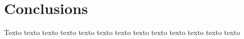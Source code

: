 \chapter{Conclusions}
\label{cap:conclusions}

Texto texto texto texto texto texto texto texto texto texto texto texto texto

